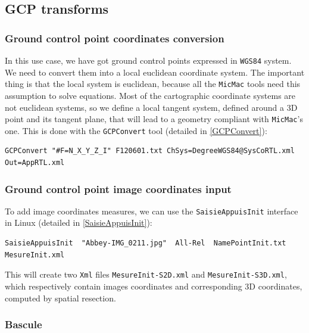 
\subsection{GCP transforms}
		

\subsubsection{Ground control point coordinates conversion}

In this use case, we have got ground control points expressed in {\tt WGS84} system. We need to convert them into a local euclidean coordinate system. The important thing is that the local system is euclidean, because all the {\tt MicMac} tools
need this assumption to solve equations. Most of the cartographic coordinate systems are not euclidean systems, so we define a local tangent system, defined around a 3D point and its tangent plane, that will lead to a geometry compliant with {\tt MicMac}'s one.
This is done with the {\tt GCPConvert} tool (detailed in \ref{GCPConvert}):

\begin{verbatim}
GCPConvert "#F=N_X_Y_Z_I" F120601.txt ChSys=DegreeWGS84@SysCoRTL.xml Out=AppRTL.xml
\end{verbatim}

\subsubsection{Ground control point image coordinates input}

To add image coordinates measures, we can use the {\tt SaisieAppuisInit} interface in Linux (detailed in \ref{SaisieAppuisInit}):

\begin{verbatim}
SaisieAppuisInit  "Abbey-IMG_0211.jpg"  All-Rel  NamePointInit.txt  MesureInit.xml
\end{verbatim}

This will create two {\tt Xml} files {\tt MesureInit-S2D.xml} and {\tt MesureInit-S3D.xml}, which respectively contain images coordinates and corresponding 3D coordinates, computed by spatial resection.

\subsubsection{Bascule}

